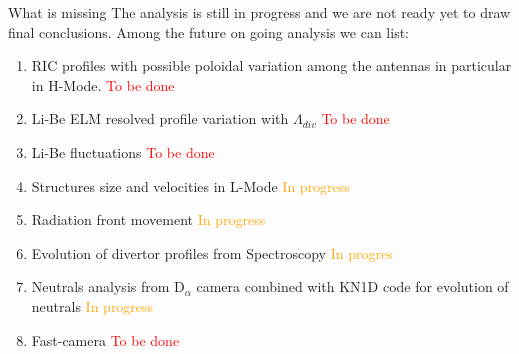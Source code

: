 \documentclass[10pt, compress]{beamer}
\newcommand\Fontvi{\fontsize{8}{7.2}\selectfont}
\begin{document}
\begin{frame}{What is missing}
  \Fontvi
  The analysis is still in progress and we are not ready yet to draw
  final conclusions. Among the future on going analysis we can list:
  \begin{enumerate}
    \item RIC profiles with possible poloidal variation among the
      antennas in particular in H-Mode. \textcolor{red}{To be done}
    \item Li-Be ELM resolved profile variation with $\Lambda_{div}$
      \textcolor{red}{To be done}
    \item Li-Be fluctuations \textcolor{red}{To be done}
    \item Structures size and velocities in L-Mode
      \textcolor{orange}{In progress}
    \item Radiation front movement \textcolor{orange}{In progress}
    \item Evolution of divertor profiles from Spectroscopy
      \textcolor{orange}{In progres}
    \item Neutrals analysis from D$_{\alpha}$ camera combined with
      KN1D code for evolution of neutrals
      \textcolor{orange}{In progress}
    \item Fast-camera \textcolor{red}{To be done}
  \end{enumerate}
\end{frame}
\end{document}
